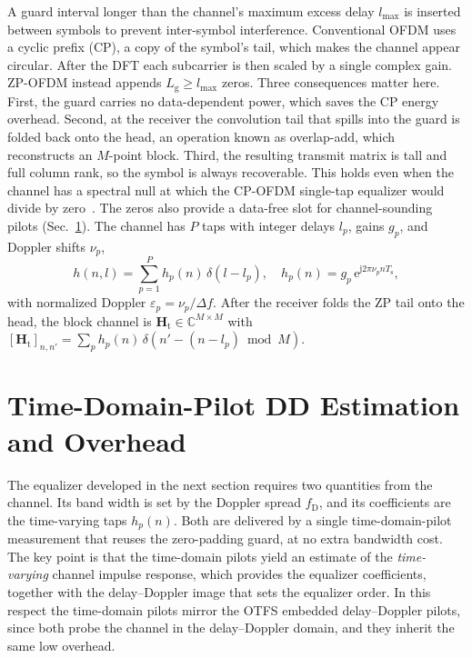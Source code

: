 \documentclass[onecolumn,journal]{IEEEtran}
\theoremstyle{bfhead}
\newcommand{\Ts}{T_{\mathrm{s}}}
\newcommand{\eu}{\mathrm{e}}
\newcommand{\jj}{\mathrm{j}}
\newcommand{\bH}{\bm{H}}
\begin{document}
A guard interval longer than the channel's maximum excess delay $l_{\max}$ is
inserted between symbols to prevent inter-symbol interference. Conventional
OFDM uses a cyclic prefix (CP), a copy of the symbol's tail, which makes the
channel appear circular. After the DFT each subcarrier is then scaled by a single
complex gain. ZP-OFDM instead appends $L_{\mathrm g}\ge l_{\max}$ zeros. Three
consequences matter here. First, the guard carries no data-dependent power, which
saves the CP energy overhead. Second, at the receiver the convolution tail that
spills into the guard is folded back onto the head, an operation known as
overlap-add, which reconstructs an $M$-point block. Third, the resulting transmit
matrix is tall and full column rank, so the symbol is always recoverable. This
holds even when the channel has a spectral null at which the CP-OFDM single-tap
equalizer would divide by zero~\cite{Muquet2002}. The zeros also provide a
data-free slot for channel-sounding pilots (Sec.~\ref{sec:est}). The channel has $P$ taps with
integer delays $l_p$, gains $g_p$, and Doppler shifts $\nu_p$,
\begin{equation}
h(n,l)=\sum_{p=1}^{P} h_p(n)\,\delta(l-l_p),\quad
h_p(n)=g_p\,\eu^{\jj2\pi\nu_p n\Ts},
\label{eq:tvchan}
\end{equation}
with normalized Doppler $\varepsilon_p=\nu_p/\Delta f$. After the receiver folds
the ZP tail onto the head, the block channel is $\bH_{\mathrm t}\in\mathbb{C}^{M\times M}$
with $[\bH_{\mathrm t}]_{n,n'}=\sum_p h_p(n)\,\delta(n'-(n-l_p)\bmod M)$.

\section{Time-Domain-Pilot DD Estimation and Overhead}
\label{sec:est}
The equalizer developed in the next section requires two quantities from the
channel. Its band width is set by the Doppler spread $f_{\mathrm D}$, and its
coefficients are the time-varying taps $h_p(n)$. Both are delivered by a single
time-domain-pilot measurement that reuses the zero-padding guard, at no extra
bandwidth cost. The key point is that the time-domain pilots yield an estimate of
the \emph{time-varying} channel impulse response, which provides the equalizer
coefficients, together with the delay--Doppler image that sets the equalizer
order. In this respect the time-domain pilots mirror the OTFS embedded
delay--Doppler pilots, since both probe the channel in the delay--Doppler domain,
and they inherit the same low overhead.
\end{document}
